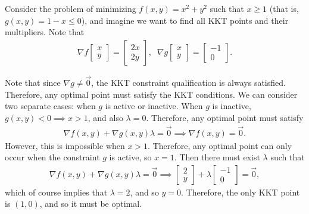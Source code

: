\begin{exmp}
    Consider the problem of minimizing $f(x, y) = x^2 + y^2$ such that $x \geq 1$ (that is, $g(x, y) = 1 - x \leq 0$), and imagine we want to find all KKT points and their multipliers. Note that
    \begin{align*}
        \nabla f\begin{bmatrix}
            x \\ y
        \end{bmatrix} = \begin{bmatrix}
            2x \\ 2y
        \end{bmatrix},\;\;
        \nabla g\begin{bmatrix}
            x \\ y
        \end{bmatrix} = \begin{bmatrix}
            -1 \\ 0
        \end{bmatrix}.
    \end{align*}

    Note that since $\nabla g \neq \vec{0}$, the KKT constraint qualification is always satisfied. Therefore, any optimal point must satisfy the KKT conditions. We can consider two separate cases: when $g$ is active or inactive. When $g$ is inactive, $g(x, y) < 0 \implies x > 1$, and also $\lambda = 0$. Therefore, any optimal point must satisfy
    \begin{align*}
        \nabla f(x, y) + \nabla g(x, y)\lambda = \vec{0} \implies \nabla f(x, y) = \vec{0}.
    \end{align*}
    However, this is impossible when $x > 1$. Therefore, any optimal point can only occur when the constraint $g$ is active, so $x = 1$. Then there must exist $\lambda$ such that
    \begin{align*}
        \nabla f(x, y) + \nabla g(x, y)\lambda = \vec{0} \implies \begin{bmatrix}
            2 \\ y
        \end{bmatrix} + \lambda \begin{bmatrix}
            -1 \\ 0
        \end{bmatrix} = \vec{0},
    \end{align*}
    which of course implies that $\lambda = 2$, and so $y = 0$. Therefore, the only KKT point is $(1, 0)$, and so it must be optimal.
\end{exmp}

